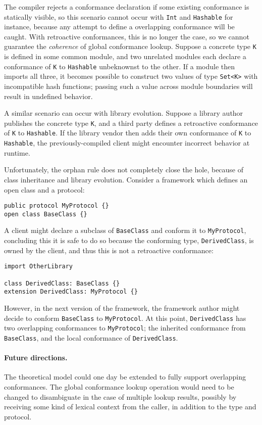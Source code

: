 \documentclass[../generics]{subfiles}
\begin{document}
The compiler rejects a conformance declaration if some existing conformance is statically visible, so this scenario cannot occur with \texttt{Int} and \texttt{Hashable} for instance, because any attempt to define a overlapping conformance will be caught. With retroactive conformances, this is no longer the case, so we cannot guarantee the \emph{coherence} of global conformance lookup. Suppose a concrete type \texttt{K} is defined in some common module, and two unrelated modules each declare a conformance of \texttt{K} to \texttt{Hashable} unbeknownst to the other. If a module then imports all three, it becomes possible to construct two values of type \texttt{Set<K>} with incompatible hash functions; passing such a value across module boundaries will result in undefined behavior.

A similar scenario can occur with library evolution. Suppose a library author publishes the concrete type \texttt{K}, and a third party defines a retroactive conformance of \texttt{K} to \texttt{Hashable}. If the library vendor then adds their own conformance of \texttt{K} to \texttt{Hashable}, the previously-compiled client might encounter incorrect behavior at runtime.

Unfortunately, the orphan rule does not completely close the hole, because of class inheritance and library evolution. Consider a framework which defines an open class and a protocol:
\begin{Verbatim}
public protocol MyProtocol {}
open class BaseClass {}
\end{Verbatim}
A client might declare a subclass of \texttt{BaseClass} and conform it to \texttt{MyProtocol}, concluding this it is safe to do so because the conforming type, \texttt{DerivedClass}, is owned by the client, and thus this is not a retroactive conformance:
\begin{Verbatim}
import OtherLibrary

class DerivedClass: BaseClass {}
extension DerivedClass: MyProtocol {}
\end{Verbatim}
However, in the next version of the framework, the framework author might decide to conform \texttt{BaseClass} to \texttt{MyProtocol}. At this point, \texttt{DerivedClass} has two overlapping conformances to \texttt{MyProtocol}; the inherited conformance from \texttt{BaseClass}, and the local conformance of \texttt{DerivedClass}.

\paragraph{Future directions.} The theoretical model could one day be extended to fully support overlapping conformances. The global conformance lookup operation would need to be changed to disambiguate in the case of multiple lookup results, possibly by receiving some kind of lexical context from the caller, in addition to the type and protocol.
\end{document}
